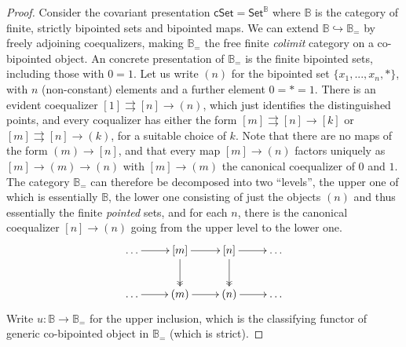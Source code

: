 \documentclass[11pt]{amsart}
\newcommand{\B}{\ensuremath{\mathbb{B}}}
\newcommand{\Set}{\ensuremath{\mathsf{Set}}}
\newcommand{\cSet}{\ensuremath{\mathsf{cSet}}}
\newcommand{\hook}{\ensuremath{\hookrightarrow}}
\renewcommand{\to}{\ensuremath{\rightarrow}}
\theoremstyle{remark}
\theoremstyle{definition}
\begin{document}
\begin{proof}
Consider the covariant presentation $\cSet = \Set^\B$ where $\B$ is the category of finite, strictly bipointed sets and bipointed maps.  We can extend $\B\hook\B_=$ by freely adjoining coequalizers, making $\B_=$ the free finite \emph{colimit} category on a co-bipointed object. An concrete presentation of $\B_=$ is the finite bipointed sets, including those with $0=1$.  Let us write $(n)$ for the bipointed set $\{x_1, ..., x_n, *\}$, with $n$ (non-constant) elements and a further element $0=*=1$.  There is an evident coequalizer $[1]\rightrightarrows [n]\to(n)$, which just identifies the distinguished points, and every coqualizer has either the form $[m]\rightrightarrows [n]\to [k]$ or $[m]\rightrightarrows [n]\to(k)$, for a suitable choice of $k$.  Note that there are no maps of the form $(m)\to [n]$, and that every map $[m]\to (n)$ factors uniquely as $[m]\to (m)\to (n)$ with  $[m]\to(m)$ the canonical coequalizer of $0$ and $1$.  The category $\B_=$ can therefore be decomposed into two ``levels'', the upper one of which is essentially $\B$, the lower one consisting of just the objects $(n)$ and thus essentially the finite \emph{pointed} sets, and for each $n$, there is the canonical coequalizer $[n]\to(n)$ going from the upper level to the lower one.
\[
\xymatrix{
\dots \ar[r] & [m] \ar@{->>}[d] \ar[r] & [n] \ar@{->>}[d] \ar[r] & \dots \\
\dots \ar[r] & (m) \ar[r] & (n) \ar[r] & \dots
}
\]
Write $u : \B\to\B_=$ for the upper inclusion, which is the classifying functor of generic co-bipointed object in $\B_=$ (which is strict).  


\end{proof}
\end{document}
